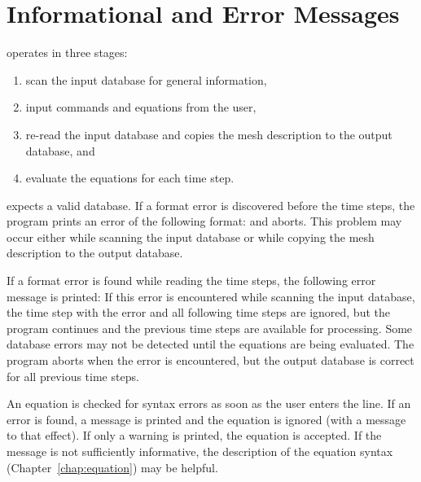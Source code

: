 \chapter{Informational and Error Messages} \label{chap:errmsg}

\caps{\PROGRAM} operates in three stages:

\begin{enumerate}

\item scan the input database for general information,

\item input commands and equations from the user,

\item re-read the input database and copies the mesh description to
  the output database, and

\item evaluate the equations for each time step.

\end{enumerate}

\caps{\PROGRAM} expects a valid database. If a format error is
discovered before the time steps, the program prints an error of the
following format:
and aborts. This problem may occur either while scanning the input
database or while copying the mesh description to the output database.

If a format error is found while reading the time steps, the following
error message is printed:
If this error is encountered while scanning the input database, the time
step with the error and all following time steps are ignored, but the
program continues and the previous time steps are available for
processing. Some database errors may not be detected until the equations
are being evaluated. The program aborts when the error is encountered,
but the output database is correct for all previous time steps.

An equation is checked for syntax errors as soon as the user enters the
line. If an error is found, a message is printed and the equation is
ignored (with a message to that effect). If only a warning is printed,
the equation is accepted. If the message is not sufficiently
informative, the description of the equation syntax
(Chapter~\ref{chap:equation}) may be helpful. 

